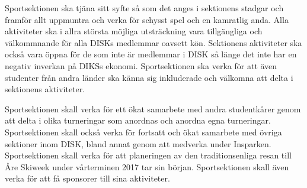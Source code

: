 \documentclass[12pt,a4paper]{article}
\begin{document}
	Sportsektionen ska tjäna sitt syfte så som det anges i sektionens stadgar och framför allt uppmuntra och verka för schysst spel och en kamratlig anda. Alla aktiviteter ska i allra största möjliga utsträckning vara tillgängliga och välkommnande för alla DISKs medlemmar oavsett kön. Sektionens aktiviteter ska också vara öppna för de som inte är medlemmar i DISK så länge det inte har en negativ inverkan på DIKSs ekonomi. Sportsektionen ska verka för att även studenter från andra länder ska känna sig inkluderade och välkomna att delta i sektionens aktiviteter.

	Sportsektionen skall verka för ett ökat samarbete med andra studentkårer genom att delta i olika turneringar som anordnas och anordna egna turneringar. Sportsektionen skall också verka för fortsatt och ökat samarbete med övriga sektioner inom DISK, bland annat genom att medverka under Insparken. Sportsektionen skall verka för att planeringen av den traditionsenliga  resan till Åre Skiweek under vårterminen 2017 tar sin början. Sportsektionen skall även verka för att få sponsorer till sina aktiviteter.
\end{document}

